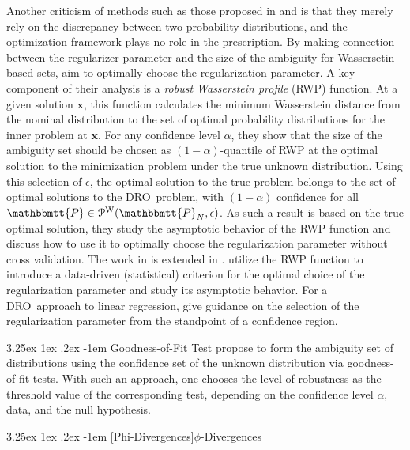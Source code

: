 \documentclass[final,onefignum,onetabnum]{class}
\makeatletter
\renewcommand\paragraph{\@startsection{paragraph}{4}{\z@}%
  {3.25ex \@plus1ex \@minus.2ex}%
  {-1em}%
  {\normalfont\normalsize\bfseries}}
\newcommand{\bs}[1]{\boldsymbol{#1}} %
\newcommand{\Ts}[1]{\mathbbmtt{#1}} %
\newcommand{\Cs}[1]{\mathcal{#1}} %
\newcommand{\dro}{DRO}
\makeatother
\begin{document}
Another criticism of methods such as those proposed in \citet{pflug2007} and \citet{pflug2012} is that they merely rely on the discrepancy between two probability distributions, and the optimization framework plays no role in the prescription. By making connection between the regularizer parameter and the size of the ambiguity for Wassersetin-based sets, \citet{blanchet2016robust}  aim to optimally  choose the regularization parameter. A key component of their analysis is a {\it robust Wasserstein profile} (RWP) function. At a given solution $\bs{x}$, this function calculates the minimum Wasserstein distance from the nominal distribution to the set of optimal probability distributions for the inner problem at $\bs{x}$. For any confidence level $\alpha$, they show that the size of the ambiguity set should be chosen as $(1-\alpha)$-quantile of RWP at the optimal solution to the minimization problem under the true unknown distribution. Using this selection of  $\epsilon$, the optimal solution to the true problem belongs to the set of optimal solutions to the \dro\ problem, with $(1-\alpha)$ confidence for all $\Ts{P} \in \Cs{P}^{\text{W}}(\Ts{P}_{N},\epsilon)$. As such a result is based on the true optimal solution, they study the asymptotic behavior of the RWP function and discuss how to use it to optimally  choose the regularization parameter without cross validation.  
The  work in \citet{blanchet2016robust} is extended in \citet{blanchet2017groupwise,blanchet2016SOS}. \citet{blanchet2017groupwise} utilize  the RWP function to introduce a data-driven (statistical) criterion for the optimal choice of the regularization parameter and study its asymptotic behavior. 
%
For  a \dro\ approach to linear regression, \citet{chen2018regression}  give guidance on the selection of the regularization parameter from the standpoint of a confidence region. 

\paragraph{Goodness-of-Fit Test}
\citet{bertsimas2018RO} propose to form the ambiguity set of distributions using the  confidence set of the unknown distribution via goodness-of-fit tests. With such an approach, one chooses the level of robustness as the threshold value of the corresponding test, depending on the confidence level $\alpha$, data, and the null hypothesis.

\paragraph[Phi-Divergences]{\texorpdfstring{$\phi$-Divergences}{Phi-Divergences}}
\end{document}
